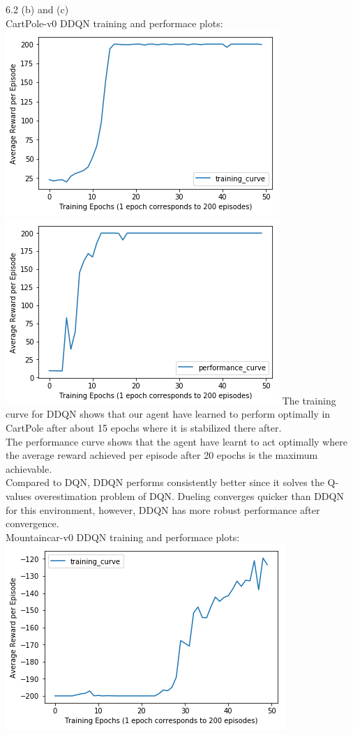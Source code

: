 \documentclass[12pt]{article}
\begin{document}
    \begin{tcolorbox}[fit,height=22cm, width=\textwidth, blank, borderline={1pt}{-2pt},nobeforeafter]
    {\large 6.2  (b) and (c)} \\
    {\large CartPole-v0 DDQN training and performace plots:} \\
    \includegraphics[width=.5\textwidth]{figures/CP_ddqn_training_curve}
    \includegraphics[width=.5\textwidth]{figures/CP_ddqn_performance_curve}
    The training curve for DDQN shows that our agent have learned to perform optimally in CartPole after about 15 epochs where it is stabilized there after. \\
    The performance curve shows that the agent have learnt to act optimally where the average reward achieved per episode after 20 epochs is the maximum achievable.\\
    Compared to DQN, DDQN performs consistently better since it solves the Q-values overestimation problem of DQN. Dueling converges quicker than DDQN for this environment, however, DDQN has more robust performance after convergence.
    \\
   	{\large Mountaincar-v0 DDQN training and performace plots:} \\
    \includegraphics[width=.5\textwidth]{figures/MC_ddqn_training_curve}

\end{tcolorbox}
\end{document}

